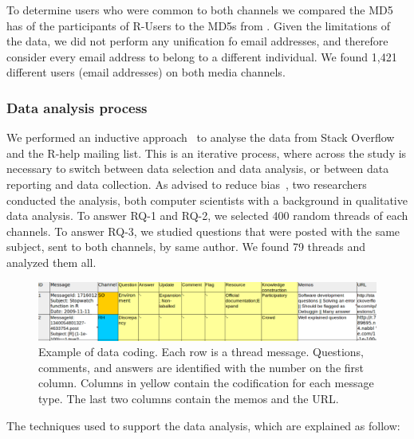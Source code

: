 To determine users who were common to both channels we compared the MD5 has of the participants of R-Users to the MD5s from \SO. Given the limitations of the
\SO data, we did not perform any unification fo email addresses, and therefore consider every email address to belong to a different individual. 
We found 1,421 different users (email addresses) on both media channels.




\subsubsection{Data analysis process}
\label{sec:dap}

    We performed an inductive approach~\cite{Runeson2012} to analyse the data from Stack Overflow and the R-help mailing list. 
    This is an iterative process, where across the study is necessary to switch between data selection and data analysis, or between data reporting and data collection.
    As advised to reduce bias~\cite{Runeson2012}, two researchers conducted the analysis, both computer scientists with a background in qualitative data analysis.
To answer RQ-1 and RQ-2, we selected 400 random threads of each channels.
To answer RQ-3, we studied questions that were posted with the same subject, sent to both channels, by same author. We found 79 threads and analyzed them all.
    
    \begin{figure}[htbp]
    	\centering
    	\includegraphics[width=.95\textwidth]{Figures/CodingExample}
    	\caption{Example of data coding. Each row is a thread message. Questions, comments, and answers are identified with the number on the first column. Columns in yellow contain the codification for each message type. The last two columns contain the memos and the URL.}
    	\label{fig:CodingExample}
    \end{figure}

    The techniques used to support the data analysis, which are explained as follow:

